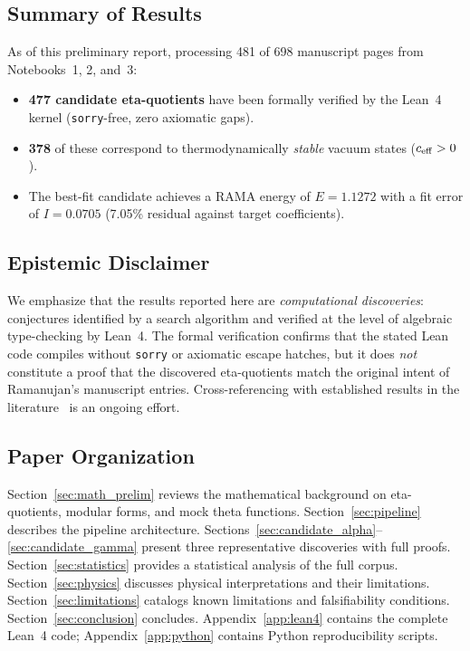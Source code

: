 \subsection{Summary of Results}

As of this preliminary report, processing 481 of 698
manuscript pages from Notebooks~1, 2, and~3:
\begin{itemize}
  \item \textbf{477 candidate eta-quotients} have been
        formally verified by the Lean~4 kernel
        (\texttt{sorry}-free, zero axiomatic gaps).
  \item \textbf{378} of these correspond to thermodynamically
        \emph{stable} vacuum states ($c_{\mathrm{eff}} > 0$).
  \item The best-fit candidate achieves a RAMA energy of
        $E = 1.1272$ with a fit error of $I = 0.0705$
        (7.05\% residual against target coefficients).
\end{itemize}

\subsection{Epistemic Disclaimer}

We emphasize that the results reported here are
\emph{computational discoveries}: conjectures identified
by a search algorithm and verified at the level of
algebraic type-checking by Lean~4.  The formal verification
confirms that the stated Lean code compiles without
\texttt{sorry} or axiomatic escape hatches, but it does
\emph{not} constitute a proof that the discovered
eta-quotients match the original intent of Ramanujan's
manuscript entries.  Cross-referencing with established
results in the literature~\cite{andrews_berndt_I,andrews_berndt_II,ono2004}
is an ongoing effort.

\subsection{Paper Organization}

Section~\ref{sec:math_prelim} reviews the mathematical
background on eta-quotients, modular forms, and mock theta
functions.
Section~\ref{sec:pipeline} describes the \RAMA{} pipeline
architecture.
Sections~\ref{sec:candidate_alpha}--\ref{sec:candidate_gamma}
present three representative discoveries with full proofs.
Section~\ref{sec:statistics} provides a statistical analysis
of the full corpus.
Section~\ref{sec:physics} discusses physical interpretations
and their limitations.
Section~\ref{sec:limitations} catalogs known limitations and
falsifiability conditions.
Section~\ref{sec:conclusion} concludes.
Appendix~\ref{app:lean4} contains the complete Lean~4 code;
Appendix~\ref{app:python} contains Python reproducibility
scripts.
